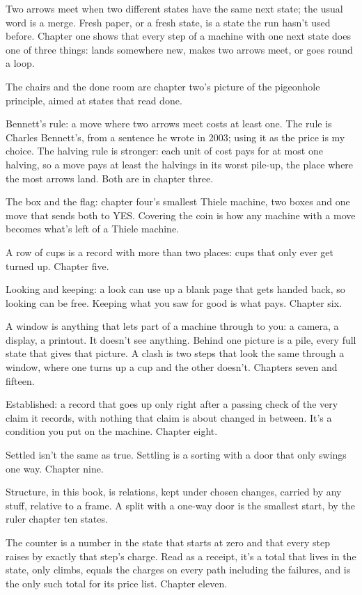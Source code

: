 \documentclass[11pt,twoside]{article}
\theoremstyle{thielethm}
\theoremstyle{thieledef}
\theoremstyle{thieledef}
\theoremstyle{thieledef}
\theoremstyle{thielethm}
\theoremstyle{thieleobs}
\theoremstyle{thielethm}
\begin{document}
Two arrows meet when two different states have the same next state; the usual word is a merge. Fresh paper, or a fresh state, is a state the run hasn't used before. Chapter one shows that every step of a machine with one next state does one of three things: lands somewhere new, makes two arrows meet, or goes round a loop.

The chairs and the done room are chapter two's picture of the pigeonhole principle, aimed at states that read done.

Bennett's rule: a move where two arrows meet costs at least one. The rule is Charles Bennett's, from a sentence he wrote in 2003; using it as the price is my choice. The halving rule is stronger: each unit of cost pays for at most one halving, so a move pays at least the halvings in its worst pile-up, the place where the most arrows land. Both are in chapter three.

The box and the flag: chapter four's smallest Thiele machine, two boxes and one move that sends both to YES. Covering the coin is how any machine with a move becomes what's left of a Thiele machine.

A row of cups is a record with more than two places: cups that only ever get turned up. Chapter five.

Looking and keeping: a look can use up a blank page that gets handed back, so looking can be free. Keeping what you saw for good is what pays. Chapter six.

A window is anything that lets part of a machine through to you: a camera, a display, a printout. It doesn't see anything. Behind one picture is a pile, every full state that gives that picture. A clash is two steps that look the same through a window, where one turns up a cup and the other doesn't. Chapters seven and fifteen.

Established: a record that goes up only right after a passing check of the very claim it records, with nothing that claim is about changed in between. It's a condition you put on the machine. Chapter eight.

Settled isn't the same as true. Settling is a sorting with a door that only swings one way. Chapter nine.

Structure, in this book, is relations, kept under chosen changes, carried by any stuff, relative to a frame. A split with a one-way door is the smallest start, by the ruler chapter ten states.

The counter is a number in the state that starts at zero and that every step raises by exactly that step's charge. Read as a receipt, it's a total that lives in the state, only climbs, equals the charges on every path including the failures, and is the only such total for its price list. Chapter eleven.
\end{document}

